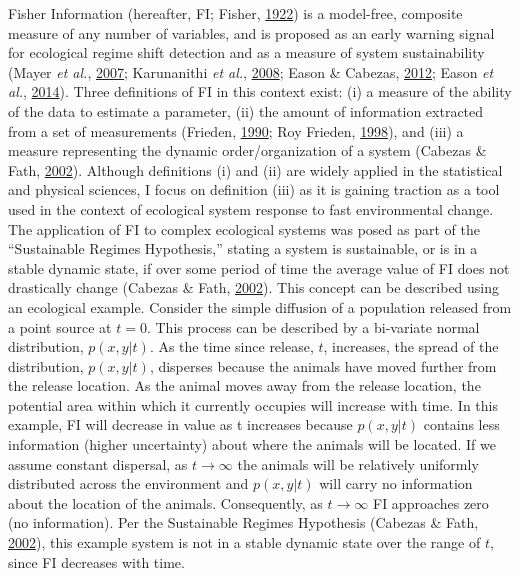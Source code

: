 \documentclass[print]{nuthesis}
\begin{document}
Fisher Information (hereafter, FI; Fisher, \protect\hyperlink{ref-fisher_mathematical_1922}{1922}) is a model-free, composite measure of any number of variables, and is proposed as an early warning signal for ecological regime shift detection and as a measure of system sustainability (Mayer \emph{et al.}, \protect\hyperlink{ref-mayer_applications_2007}{2007}; Karunanithi \emph{et al.}, \protect\hyperlink{ref-karunanithi_detection_2008}{2008}; Eason \& Cabezas, \protect\hyperlink{ref-eason_evaluating_2012}{2012}; Eason \emph{et al.}, \protect\hyperlink{ref-eason2014managing}{2014}). Three definitions of FI in this context exist: (i) a measure of the ability of the data to estimate a parameter, (ii) the amount of information extracted from a set of measurements (Frieden, \protect\hyperlink{ref-frieden_fisher_1990}{1990}; Roy Frieden, \protect\hyperlink{ref-frieden_physics_1998}{1998}), and (iii) a measure representing the dynamic order/organization of a system (Cabezas \& Fath, \protect\hyperlink{ref-cabezas_towards_2002}{2002}). Although definitions (i) and (ii) are widely applied in the statistical and physical sciences, I focus on definition (iii) as it is gaining traction as a tool used in the context of ecological system response to fast environmental change. The application of FI to complex ecological systems was posed as part of the ``Sustainable Regimes Hypothesis,'' stating a system is sustainable, or is in a stable dynamic state, if over some period of time the average value of FI does not drastically change (Cabezas \& Fath, \protect\hyperlink{ref-cabezas_towards_2002}{2002}). This concept can be described using an ecological example. Consider the simple diffusion of a population released from a point source at \(t=0\). This process can be described by a bi-variate normal distribution, \(p(x,y|t)\). As the time since release, \(t\), increases, the spread of the distribution, \(p(x,y|t)\), disperses because the animals have moved further from the release location. As the animal moves away from the release location, the potential area within which it currently occupies will increase with time. In this example, FI will decrease in value as t increases because \(p(x,y|t)\) contains less information (higher uncertainty) about where the animals will be located. If we assume constant dispersal, as \(t\rightarrow\infty\) the animals will be relatively uniformly distributed across the environment and \(p(x,y|t)\) will carry no information about the location of the animals. Consequently, as \(t\rightarrow\infty\) FI approaches zero (no information). Per the Sustainable Regimes Hypothesis (Cabezas \& Fath, \protect\hyperlink{ref-cabezas_towards_2002}{2002}), this example system is not in a stable dynamic state over the range of \(t\), since FI decreases with time.
\end{document}
